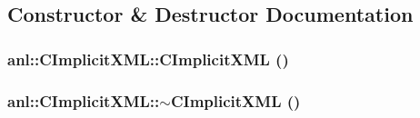 \subsection{Constructor \& Destructor Documentation}
\hypertarget{classanl_1_1CImplicitXML_a2b530401942e354d6b1e280d6dd6e573}{
\subsubsection[{CImplicitXML}]{\setlength{\rightskip}{0pt plus 5cm}anl::CImplicitXML::CImplicitXML ()}}
\label{classanl_1_1CImplicitXML_a2b530401942e354d6b1e280d6dd6e573}
\hypertarget{classanl_1_1CImplicitXML_a5aa6729363fc5502bdab35fb8bcbb9cd}{
\subsubsection[{$\sim$CImplicitXML}]{\setlength{\rightskip}{0pt plus 5cm}anl::CImplicitXML::$\sim$CImplicitXML ()}}
\label{classanl_1_1CImplicitXML_a5aa6729363fc5502bdab35fb8bcbb9cd}


